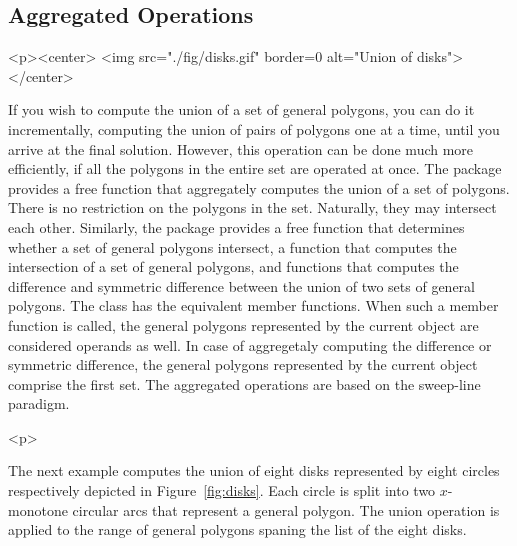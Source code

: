 \subsection{Aggregated Operations}
\label{bso_ssec:}
\begin{ccHtmlOnly}
  <p><center>
    <img src="./fig/disks.gif" border=0 alt="Union of disks">
  </center>
\end{ccHtmlOnly}
If you wish to compute the union of a set of general polygons, you can
do it incrementally, computing the union of pairs of polygons one at a
time, until you arrive at the final solution. However, this operation
can be done much more efficiently, if all the polygons in the entire
set are operated at once. The package provides a free function that
aggregately computes the union of a set of polygons. There is no
restriction on the polygons in the set. Naturally, they may intersect
each other. Similarly, the package provides a free function that
determines whether a set of general polygons intersect, a function
that computes the intersection of a set of general polygons, and
functions that computes the difference and symmetric difference between
the union of two sets of general polygons. The class
 has the equivalent member functions. When
such a member function is called, the general polygons represented by
the current object are considered operands as well. In case of
aggregetaly computing the difference or symmetric difference, the
general polygons represented by the current object comprise the first
set. The aggregated operations are based on the sweep-line
paradigm. 

\begin{ccHtmlOnly}<p>\end{ccHtmlOnly}
The next example computes the union of eight disks represented by
eight circles respectively depicted in Figure~\ref{fig:disks}. Each
circle is split into two $x$-monotone circular arcs that represent a
general polygon. The union operation is applied to the range of
general polygons spaning the list of the eight disks.

